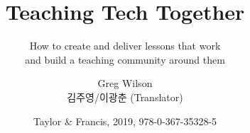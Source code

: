 \documentclass[nemilov1]{../tex/Nemilov}
\begin{document}
\title{Teaching Tech Together}
\subtitle{How to create and deliver lessons that work\\ and build a teaching community around them}
\author{Greg Wilson\\[1ex] 
\small 김주영/이광춘 (Translator)}
\date{Taylor \& Francis, 2019, 978-0-367-35328-5}
\maketitle

\frontmatter

\tableofcontents


\mainmatter
















\cleardoublepage

\printbibliography

\appendix
% 
% 
% 
% 
% 
% 
% 
% 


\printindex
\end{document}
